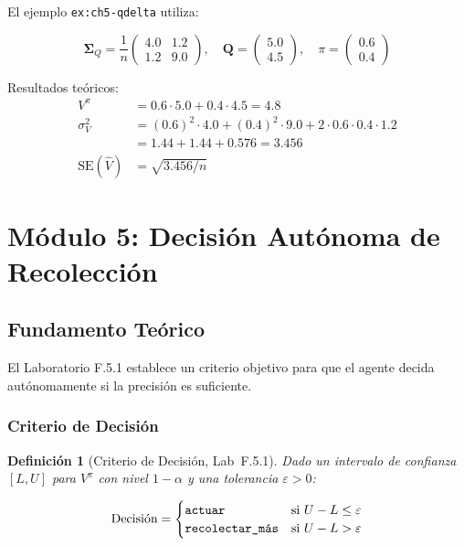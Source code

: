 \documentclass[12pt,a4paper]{article}
\newtheorem{definition}[theorem]{Definición}
\begin{document}
El ejemplo \texttt{ex:ch5-qdelta} utiliza:

\[
	\boldsymbol{\Sigma}_Q = \frac{1}{n} \begin{pmatrix} 4.0 & 1.2 \\ 1.2 & 9.0 \end{pmatrix}, \quad
	\mathbf{Q} = \begin{pmatrix} 5.0 \\ 4.5 \end{pmatrix}, \quad
	\pi = \begin{pmatrix} 0.6 \\ 0.4 \end{pmatrix}
\]

Resultados teóricos:
\[
	\begin{aligned}
		V^{\pi}            & = 0.6 \cdot 5.0 + 0.4 \cdot 4.5 = 4.8                                     \\
		\sigma^2_V         & = (0.6)^2 \cdot 4.0 + (0.4)^2 \cdot 9.0 + 2 \cdot 0.6 \cdot 0.4 \cdot 1.2 \\
		                   & = 1.44 + 1.44 + 0.576 = 3.456                                             \\
		\text{SE}(\hat{V}) & = \sqrt{3.456 / n}
	\end{aligned}
\]

\newpage

\section{Módulo 5: Decisión Autónoma de Recolección}

\subsection{Fundamento Teórico}

El Laboratorio F.5.1 establece un criterio objetivo para que el agente decida autónomamente si la precisión es suficiente.

\subsubsection{Criterio de Decisión}

\begin{definition}[Criterio de Decisión, Lab~F.5.1]
	Dado un intervalo de confianza $[L, U]$ para $V^{\pi}$ con nivel $1-\alpha$ y una tolerancia $\varepsilon > 0$:

	\[
		\text{Decisión} = \begin{cases}
			\text{\texttt{actuar}}          & \text{si } U - L \leq \varepsilon \\
			\text{\texttt{recolectar\_más}} & \text{si } U - L > \varepsilon
		\end{cases}
	\]
\end{definition}
\end{document}
